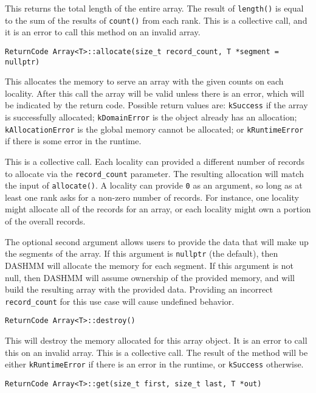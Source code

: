 \noindent This returns the total length of the entire array. The result of
\texttt{length()} is equal to the sum of the results of \texttt{count()} from
each rank. This is a collective call, and it is an error to call this method
on an invalid array.

\begin{lstlisting}
ReturnCode Array<T>::allocate(size_t record_count, T *segment = nullptr)
\end{lstlisting}

\noindent This allocates the memory to serve an array with the given
counts on each locality. After this call the array will be valid unless
there is an error, which will be indicated by the return code. Possible
return values are: \texttt{kSuccess} if the array is successfully allocated;
\texttt{kDomainError} is the object already has an allocation;
\texttt{kAllocationError} is the global memory cannot be allocated; or
\texttt{kRuntimeError} if there is some error in the runtime.

This is a collective call. Each locality can provided a different number of
records to allocate via the \texttt{record\_count} parameter. The resulting
allocation will match the input of \texttt{allocate()}. A locality can
provide \texttt{0} as an argument, so long as at least one rank asks for a
non-zero number of records. For instance, one locality might allocate all of
the records for an array, or each locality might own a portion of the overall
records.

The optional second argument allows users to provide the data that will make
up the segments of the array. If this argument is \texttt{nullptr} (the
default), then DASHMM will allocate the memory for each segment. If this
argument is not null, then DASHMM will assume ownership of the provided
memory, and will build the resulting array with the provided data.
Providing an incorrect \texttt{record\_count} for this use case will cause
undefined behavior.

\begin{lstlisting}
ReturnCode Array<T>::destroy()
\end{lstlisting}

\noindent This will destroy the memory allocated for this array object.
It is
an error to call this on an invalid array. This is a collective call. The
result of the method will be either \texttt{kRuntimeError} if there is an error
in the runtime, or \texttt{kSuccess} otherwise.

\begin{lstlisting}
ReturnCode Array<T>::get(size_t first, size_t last, T *out)
\end{lstlisting}

